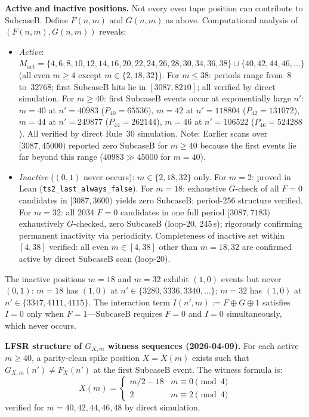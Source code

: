 \documentclass[11pt]{article}
\theoremstyle{plain}
\theoremstyle{definition}
\begin{document}
\textbf{Active and inactive positions.}  Not every even tape position can
contribute to SubcaseB.  Define $F(n,m)$ and $G(n,m)$ as above.  Computational
analysis of $(F(n,m), G(n,m))$ reveals:

\begin{itemize}
\item \emph{Active}: $M_{\mathrm{act}} = \{4, 6, 8, 10, 12, 14, 16, 20, 22,
  24, 26, 28, 30, 34, 36, 38\} \cup \{40, 42, 44, 46, \ldots\}$ (all even $m \geq 4$
  except $m \in \{2, 18, 32\}$).
  For $m \leq 38$: periods range from~8 to~$32768$; first SubcaseB hits lie
  in $[3087, 8210]$; all verified by direct simulation.
  For $m \geq 40$: first SubcaseB events occur at exponentially large $n'$:
  $m=40$ at $n'=40983$ ($P_{40}=65536$),
  $m=42$ at $n'=118804$ ($P_{42}=131072$),
  $m=44$ at $n'=249877$ ($P_{44}=262144$),
  $m=46$ at $n'=106522$ ($P_{46}=524288$).
  All verified by direct Rule~30 simulation.
  Note: Earlier scans over $[3087, 45000)$ reported zero SubcaseB for $m \geq 40$
  because the first events lie far beyond this range ($40983 \gg 45000$ for $m=40$).
\item \emph{Inactive} ($(0,1)$ never occurs): $m \in \{2, 18, 32\}$ only.
  For $m=2$: proved in Lean (\texttt{ts2\_last\_always\_false}).
  For $m=18$: exhaustive $G$-check of all $F{=}0$ candidates in $[3087,3600)$
  yields zero SubcaseB; period-256 structure verified.
  For $m=32$: all 2034 $F{=}0$ candidates in one full period $[3087,7183)$
  exhaustively $G$-checked, zero SubcaseB (loop-20, 245\,s);
  rigorously confirming permanent inactivity via periodicity.
  Completeness of inactive set within $[4,38]$ verified: all even $m \in [4,38]$
  other than $m=18,32$ are confirmed active by direct SubcaseB scan (loop-20).
\end{itemize}

The inactive positions $m=18$ and $m=32$ exhibit $(1,0)$ events but never $(0,1)$:
$m=18$ has $(1,0)$ at $n' \in \{3280, 3336, 3340, \ldots\}$;
$m=32$ has $(1,0)$ at $n' \in \{3347, 4111, 4115\}$.
The interaction term $I(n',m) := F \oplus G \oplus 1$ satisfies $I=0$ only
when $F=1$---SubcaseB requires $F=0$ and $I=0$ simultaneously, which never occurs.

\textbf{LFSR structure of $G_{X,m}$ witness sequences (2026-04-09).}
For each active $m \geq 40$, a parity-clean spike position $X=X(m)$ exists such that
$G_{X,m}(n') \neq F_X(n')$ at the first SubcaseB event.  The witness formula is:
\begin{equation}
  X(m) = \begin{cases} m/2 - 18 & m \equiv 0 \pmod{4} \\ 2 & m \equiv 2 \pmod{4} \end{cases}
\end{equation}
verified for $m=40,42,44,46,48$ by direct simulation.
\end{document}
